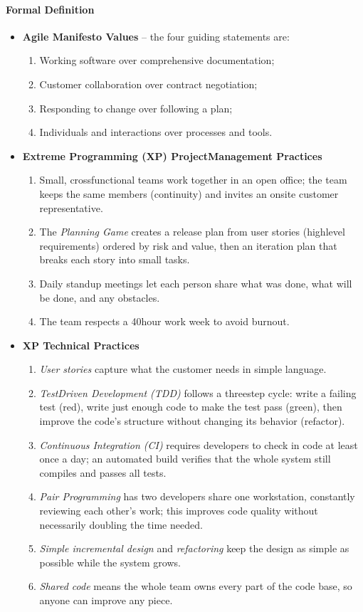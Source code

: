 \documentclass[12pt, a4paper]{article}
\begin{document}
\paragraph{Formal Definition}
\begin{itemize}
  \item \textbf{Agile Manifesto Values} -- the four guiding statements are:
  \begin{enumerate}
    \item Working software over comprehensive documentation;
    \item Customer collaboration over contract negotiation;
    \item Responding to change over following a plan;
    \item Individuals and interactions over processes and tools.
  \end{enumerate}
  \item \textbf{Extreme Programming (XP) ProjectManagement Practices}
  \begin{enumerate}
    \item Small, crossfunctional teams work together in an open office; the team keeps the same members (continuity) and invites an onsite customer representative.
    \item The \emph{Planning Game} creates a release plan from user stories (highlevel requirements) ordered by risk and value, then an iteration plan that breaks each story into small tasks.
    \item Daily standup meetings let each person share what was done, what will be done, and any obstacles.
    \item The team respects a 40hour work week to avoid burnout.
  \end{enumerate}
  \item \textbf{XP Technical Practices}
  \begin{enumerate}
    \item \emph{User stories} capture what the customer needs in simple language.
    \item \emph{TestDriven Development (TDD)} follows a threestep cycle: write a failing test (red), write just enough code to make the test pass (green), then improve the code's structure without changing its behavior (refactor).
    \item \emph{Continuous Integration (CI)} requires developers to check in code at least once a day; an automated build verifies that the whole system still compiles and passes all tests.
    \item \emph{Pair Programming} has two developers share one workstation, constantly reviewing each other's work; this improves code quality without necessarily doubling the time needed.
    \item \emph{Simple incremental design} and \emph{refactoring} keep the design as simple as possible while the system grows.
    \item \emph{Shared code} means the whole team owns every part of the code base, so anyone can improve any piece.
  \end{enumerate}
\end{itemize}
\end{document}
